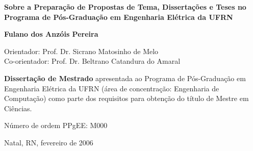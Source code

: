 \begin{titlepage}
\begin{center}
\vfill

\LARGE

\textbf{Sobre a Preparação de Propostas de Tema, Dissertações
e Teses no Programa de Pós-Graduação em Engenharia Elétrica da UFRN}

\vfill

\Large

\textbf{Fulano dos Anzóis Pereira}

\vfill

\normalsize

Orientador: Prof. Dr. Sicrano Matosinho de Melo
\\[2ex] Co-orientador: Prof. Dr. Beltrano Catandura do Amaral

\vfill

\hfill
\parbox{0.5\linewidth}{\textbf{%
Dissertação de Mestrado}
apresentada ao Programa de Pós-Graduação em Engenharia Elétrica da UFRN
(área de concentração: Engenharia de Computação)
como parte dos requisitos para obtenção do título de
Mestre em Ciências.}

\vfill

\large

Número de ordem PPgEE: M000

Natal, RN, fevereiro de 2006

\end{center}

\end{titlepage}
